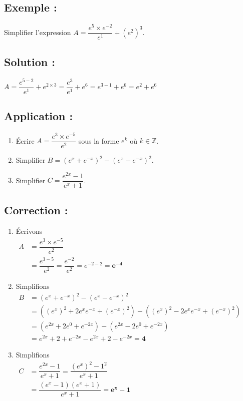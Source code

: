 \documentclass[12pt,a4paper]{article}
\begin{document}
\vspace{0.3cm}

\subsection*{\color{myred}Exemple :}
Simplifier l'expression $A = \dfrac{e^5 \times e^{-2}}{e^1} + (e^2)^3$.

\subsection*{\color{myred}Solution :}
$A = \dfrac{e^{5 - 2}}{e^1} + e^{2 \times 3} = \dfrac{e^3}{e^1} + e^6 = e^{3 - 1} + e^6 = e^2 + e^6$

\subsection*{\color{myred}Application :}
\begin{enumerate}
    \item Écrire $A = \dfrac{e^3 \times e^{-5}}{e^2}$ sous la forme $e^k$ où $k \in \mathbb{Z}$.
    \item Simplifier $B = (e^x + e^{-x})^2 - (e^x - e^{-x})^2$.
    \item Simplifier $C = \dfrac{e^{2x} - 1}{e^x + 1}$.
\end{enumerate}

\subsection*{\color{myred}Correction :}
\begin{enumerate}
\item Écrivons\\ $
\begin{aligned}
A &= \dfrac{e^3 \times e^{-5}}{e^2} \\[3mm]
  &= \dfrac{e^{3 - 5}}{e^2} = \dfrac{e^{-2}}{e^2} = e^{-2 - 2} = \mathbf{e^{-4}}
\end{aligned}
$
    \item Simplifions\\ $
\begin{aligned}
B &= (e^x + e^{-x})^2 - (e^x - e^{-x})^2\\[3mm]
  &= \left((e^x)^2 + 2e^x e^{-x} + (e^{-x})^2\right) - \left((e^x)^2 - 2e^x e^{-x} + (e^{-x})^2\right)\\[3mm]
  &= (e^{2x} + 2e^0 + e^{-2x}) - (e^{2x} - 2e^0 + e^{-2x})\\[3mm]
  &= e^{2x} + 2 + e^{-2x} - e^{2x} + 2 - e^{-2x} = \mathbf{4}
\end{aligned}
$

\item Simplifions\\ $
\begin{aligned}
C &= \dfrac{e^{2x} - 1}{e^x + 1} = \dfrac{(e^x)^2 - 1^2}{e^x + 1}\\[4mm]
  &= \dfrac{(e^x - 1)(e^x + 1)}{e^x + 1} = \mathbf{e^x - 1}
\end{aligned}
$
\end{enumerate}
\end{document}

